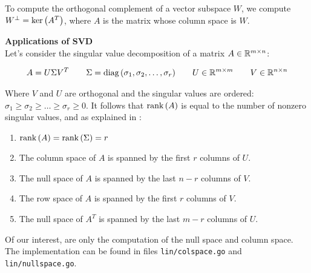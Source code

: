 To compute the orthogonal complement of a vector subspace $W$, we
compute $W^\perp = \text{ker}\left(A^T\right)$, where $A$ is the matrix whose column space 
is $W$.




\begin{note}
    \textbf{Applications of SVD} \\
  
    Let's consider the singular value decomposition of a matrix $A \in \mathbb{R}^{m \times n}$:
  
    \begin{equation*}
      \begin{aligned}
        A = U \Sigma V^T & \quad & \Sigma = \text{diag}\left(\sigma_1, \sigma_2, \hdots, \sigma_r  \right) 
         & \quad &  U \in \mathbb{R}^{m \times m} & \quad & V \in \mathbb{R}^{n \times n}
      \end{aligned}
    \end{equation*}
  
    Where $V$ and $U$ are orthogonal and the singular values are ordered: $\sigma_1 \geq \sigma_2 \geq \hdots \geq \sigma_r \geq 0$.
    It follows that $\text{rank}\left(A\right)$ is equal to the number of nonzero singular values, and
    as explained in \cite{svd}:
    
    \begin{enumerate}
      \item  $\text{rank}\left(A\right) = \text{rank}\left(\Sigma\right) = r$
      \item The column space of $A$ is spanned by the first $r$ columns of $U$.
      \item The null space of $A$ is spanned by the last $n − r$ columns of $V$.
      \item The row space of $A$ is spanned by the first $r$ columns of $V$.
      \item The null space of $A^T$ is spanned by the last $m − r$ columns of $U$.
    \end{enumerate}
    
    Of our interest, are only the computation of the null space and column space.
    The implementation 
    can be found in files \texttt{lin/colspace.go} and \texttt{lin/nullspace.go}.
  \end{note}

